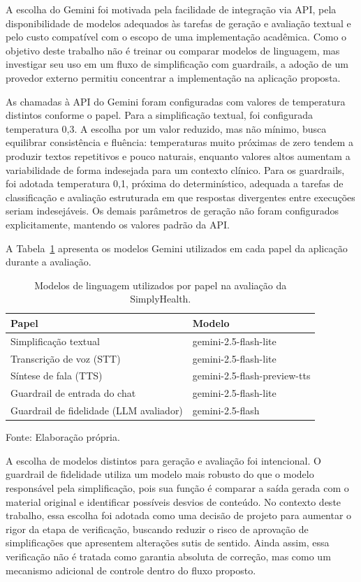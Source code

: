 A escolha do Gemini foi motivada pela facilidade de integração via API, pela disponibilidade de modelos adequados às tarefas de geração e avaliação textual e pelo custo compatível com o escopo de uma implementação acadêmica. Como o objetivo deste trabalho não é treinar ou comparar modelos de linguagem, mas investigar seu uso em um fluxo de simplificação com guardrails, a adoção de um provedor externo permitiu concentrar a implementação na aplicação proposta.

As chamadas à API do Gemini foram configuradas com valores de temperatura distintos conforme o papel. Para a simplificação textual, foi configurada temperatura 0,3. A escolha por um valor reduzido, mas não mínimo, busca equilibrar consistência e fluência: temperaturas muito próximas de zero tendem a produzir textos repetitivos e pouco naturais, enquanto valores altos aumentam a variabilidade de forma indesejada para um contexto clínico. Para os guardrails, foi adotada temperatura 0,1, próxima do determinístico, adequada a tarefas de classificação e avaliação estruturada em que respostas divergentes entre execuções seriam indesejáveis. Os demais parâmetros de geração não foram configurados explicitamente, mantendo os valores padrão da API.

A Tabela~\ref{tab:modelos-llm} apresenta os modelos Gemini utilizados em cada papel da aplicação durante a avaliação.

\begin{table}[htbp]
  \centering
  \caption{Modelos de linguagem utilizados por papel na avaliação da SimplyHealth.}
  \label{tab:modelos-llm}
  \small
  \renewcommand{\arraystretch}{1.15}
  \begin{tabular}{ll}
    \hline
    \textbf{Papel} & \textbf{Modelo} \\
    \hline
    Simplificação textual & gemini-2.5-flash-lite \\
    Transcrição de voz (STT) & gemini-2.5-flash-lite \\
    Síntese de fala (TTS) & gemini-2.5-flash-preview-tts \\
    Guardrail de entrada do chat & gemini-2.5-flash-lite \\
    Guardrail de fidelidade (LLM avaliador) & gemini-2.5-flash \\
    \hline
  \end{tabular}

  {\footnotesize Fonte: Elaboração própria.}
\end{table}

A escolha de modelos distintos para geração e avaliação foi intencional. O guardrail de fidelidade utiliza um modelo mais robusto do que o modelo responsável pela simplificação, pois sua função é comparar a saída gerada com o material original e identificar possíveis desvios de conteúdo. No contexto deste trabalho, essa escolha foi adotada como uma decisão de projeto para aumentar o rigor da etapa de verificação, buscando reduzir o risco de aprovação de simplificações que apresentem alterações sutis de sentido. Ainda assim, essa verificação não é tratada como garantia absoluta de correção, mas como um mecanismo adicional de controle dentro do fluxo proposto.

